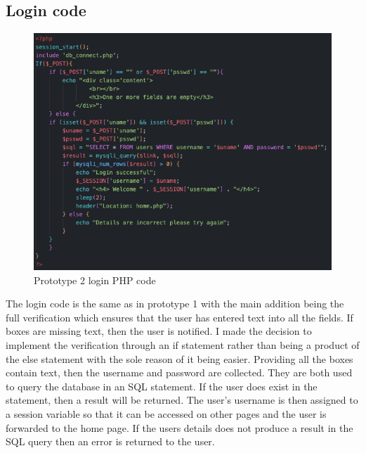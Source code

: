\subsection{Login code}
\begin{figure}[H]
    \centering
    \includegraphics[scale=0.6]{ch3_developing/proto2/proto2_login.png}
    \caption{Prototype 2 login PHP code}
    \label{fig:proto2_login}
\end{figure}
The login code is the same as in prototype 1 with the main addition being the full verification which ensures that the user has entered text into all the fields. If boxes are missing text, then the user is notified. I made the decision to implement the verification through an if statement rather than being a product of the else statement with the sole reason of it being easier. Providing all the boxes contain text, then the username and password are collected. They are both used to query the database in an SQL statement. If the user does exist in the statement, then a result will be returned. The user’s username is then assigned to a session variable so that it can be accessed on other pages and the user is forwarded to the home page. If the users details does not produce a result in the SQL query then an error is returned to the user.


